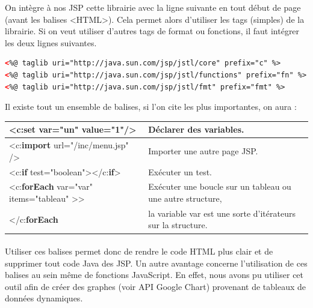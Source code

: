 On intègre à nos JSP cette librairie avec la ligne suivante en tout début de page (avant les balises <HTML>). Cela permet alors d'utiliser les tags (simples) de la librairie. Si on veut utiliser d'autres tags de format ou fonctions, il faut intégrer les deux lignes suivantes.
\begin{lstlisting}[language=XML]
<%@ taglib uri="http://java.sun.com/jsp/jstl/core" prefix="c" %>
<%@ taglib uri="http://java.sun.com/jsp/jstl/functions" prefix="fn" %>
<%@ taglib uri="http://java.sun.com/jsp/jstl/fmt" prefix="fmt" %>
\end{lstlisting}  

Il existe tout un ensemble de balises, si l'on cite les plus importantes, on aura :\\

\noindent
\begin{tabular}{|l|l|}
  \hline
      <c:\textbf{set} var="un" value="1"/> 		& Déclarer des variables. \\
  \hline 
      <c:\textbf{import} url="/inc/menu.jsp" /> 	& Importer une autre page JSP. \\
  \hline 
      <c:\textbf{if} test="boolean"></c:\textbf{if}> 	& Exécuter un test. \\
  \hline        					    
      <c:\textbf{forEach} var="var" items="tableau" >> 	& Exécuter une boucle sur un tableau ou une autre structure, \\
      </c:\textbf{forEach}				& la variable var est une sorte d'itérateurs sur la structure. \\
  \hline        					    
\end{tabular}

\paragraph{} Utiliser ces balises permet donc de rendre le code HTML plus clair et de supprimer tout code Java des JSP. Un autre avantage concerne l'utilisation de ces balises au sein même de fonctions JavaScript. En effet, nous avons pu utiliser cet outil afin de créer des graphes (voir API Google Chart) provenant de tableaux de données dynamiques.
